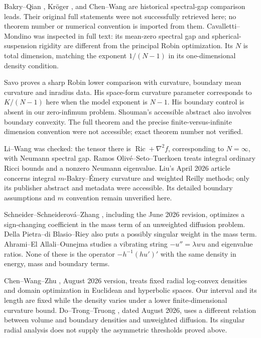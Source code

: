 \documentclass[12pt]{amsart}
\theoremstyle{definition}
\theoremstyle{remark}
\numberwithin{equation}{section}
\DeclareMathOperator{\Ric}{Ric}
\begin{document}
\begin{description}[style=nextline,leftmargin=0pt,labelwidth=0pt,labelsep=0pt]
\item[Spectral gaps and localization.]
Bakry--Qian \cite{BQ}, Kr\"oger \cite{Kroeger}, and Chen--Wang \cite{CW} are historical spectral-gap comparison leads. Their original full statements were not successfully retrieved here; no theorem number or numerical convention is imported from them. Cavalletti--Mondino \cite[Theorem 4.4 and Corollary 4.7]{CM} was inspected in full text: its mean-zero spectral gap and spherical-suspension rigidity are different from the principal Robin optimization. Its $N$ is total dimension, matching the exponent $1/(N-1)$ in its one-dimensional density condition.
\item[Robin geometric comparison.]
Savo \cite[Theorem 1, \S4.1]{Savo} proves a sharp Robin lower comparison with curvature, boundary mean curvature and inradius data. His space-form curvature parameter corresponds to $K/(N-1)$ here when the model exponent is $N-1$. His boundary control is absent in our zero-infimum problem. Shouman's accessible abstract \cite{Shouman} also involves boundary convexity. The full theorem and the precise finite-versus-infinite dimension convention were not accessible; exact theorem number not verified.
\item[Weighted nonlinear spectra and integral curvature.]
Li--Wang \cite[Theorem 1.1]{LW} was checked: the tensor there is $\Ric+\nabla^2f$, corresponding to $N=\infty$, with Neumann spectral gap. Ramos Oliv\'e--Seto--Tuerkoen \cite[Theorem 1.3]{RST} treats integral ordinary Ricci bounds and a nonzero Neumann eigenvalue. Liu's April 2026 article \cite{Liu} concerns integral $m$-Bakry--\'Emery curvature and weighted Reilly methods; only its publisher abstract and metadata were accessible. Its detailed boundary assumptions and $m$ convention remain unverified here.
\item[Asymmetric and weighted Robin optimization, 2025--2026.]
Schneider--Schneiderov\'a--Zhang \cite[\S1, Theorem 3]{SSZ}, including the June 2026 revision, optimizes a sign-changing coefficient in the mass term of an unweighted diffusion problem. Della Pietra--di Blasio--Riey \cite[\S1, \S3]{DPR} also puts a possibly singular weight in the mass term. Ahrami--El Allali--Ounejma \cite[\S1]{AEO} studies a vibrating string $-u''=\lambda w u$ and eigenvalue ratios. None of these is the operator $-h^{-1}(hu')'$ with the same density in energy, mass and boundary terms.
\item[The closest recent same-density result.]
Chen--Wang--Zhu \cite[Theorems 1.3 and 1.5]{CWZ}, August 2026 version, treats fixed radial log-convex densities and domain optimization in Euclidean and hyperbolic spaces. Our interval and its length are fixed while the density varies under a lower finite-dimensional curvature bound. Do--Trong--Truong \cite[\S1.1--1.2]{DTT}, dated August 2026, uses a different relation between volume and boundary densities and unweighted diffusion. Its singular radial analysis does not supply the asymmetric thresholds proved above.
\end{description}
\end{document}
